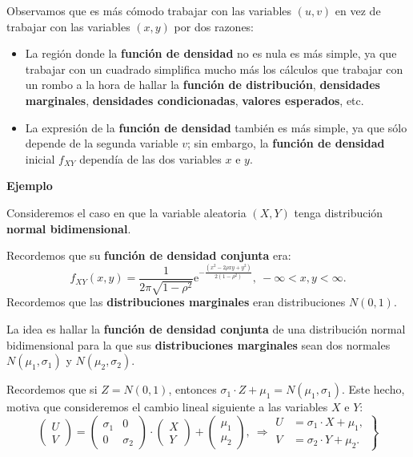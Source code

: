 \documentclass[]{book}
\providecommand{\tightlist}{%
  \setlength{\itemsep}{0pt}\setlength{\parskip}{0pt}}
\begin{document}
Observamos que es más cómodo trabajar con las variables \((u,v)\) en vez de trabajar con las variables \((x,y)\) por dos razones:

\begin{itemize}
\tightlist
\item
  La región donde la \textbf{función de densidad} no es nula es más simple, ya que trabajar con un cuadrado simplifica mucho más los cálculos que trabajar con un rombo a la hora de hallar la \textbf{función de distribución}, \textbf{densidades marginales}, \textbf{densidades condicionadas}, \textbf{valores esperados}, etc.
\item
  La expresión de la \textbf{función de densidad} también es más simple, ya que sólo depende de la segunda variable \(v\); sin embargo, la \textbf{función de densidad} inicial \(f_{XY}\) dependía de las dos variables \(x\) e \(y\).
\end{itemize}

\textbf{Ejemplo}

Consideremos el caso en que la variable aleatoria \((X,Y)\) tenga distribución \textbf{normal bidimensional}.

Recordemos que su \textbf{función de densidad conjunta} era:
\[
f_{XY}(x,y)=\frac{1}{2\pi\sqrt{1-\rho^2}}\mathrm{e}^{-\frac{(x^2-2\rho xy+y^2)}{2(1-\rho^2)}},\ -\infty <x,y<\infty.
\]
Recordemos que las \textbf{distribuciones marginales} eran distribuciones \(N(0,1)\).

La idea es hallar la \textbf{función de densidad conjunta} de una distribución normal bidimensional para la que sus \textbf{distribuciones marginales} sean dos normales \(N(\mu_1,\sigma_1)\) y \(N(\mu_2,\sigma_2)\).

Recordemos que si \(Z=N(0,1)\), entonces \(\sigma_1\cdot Z+\mu_1 =N(\mu_1,\sigma_1)\). Este hecho, motiva que consideremos el cambio lineal siguiente a las variables \(X\) e \(Y\):
\[
\begin{pmatrix}U\\ V\end{pmatrix}=\begin{pmatrix}\sigma_1 & 0\\ 0& \sigma_2\end{pmatrix}\cdot\begin{pmatrix}X\\ Y\end{pmatrix}+\begin{pmatrix}\mu_1\\\mu_2\end{pmatrix},\ \Rightarrow \left.\begin{array}{rl}U & = \sigma_1\cdot X+\mu_1,\\ V & =\sigma_2\cdot Y+\mu_2.\end{array}\right\}
\]
\end{document}
